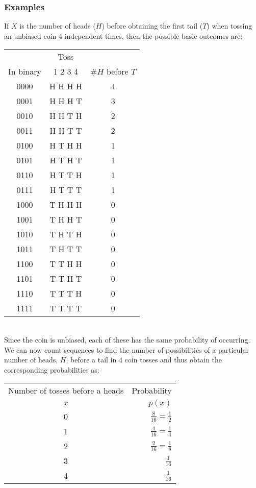 \documentclass[12pt,a4paper]{article}
\theoremstyle{regla}
\theoremstyle{remark}
\theoremstyle{definition}
\theoremstyle{nonumberbreak}
\begin{document}
\subsubsection{Examples}
\begin{xmpl}
If $X$ is the number of heads ($H$) before obtaining the first tail ($T$) when tossing an unbiased coin 4 independent times, then the possible basic outcomes are:

\begin{tabular}{c c c}
\hline
         & Toss    &   \\
In binary& 1 2 3 4 & \#$H$ before $T$\\
\hline				
0000 & H H H H & 4\\
0001 & H H H T & 3\\
0010 & H H T H & 2\\
0011 & H H T T & 2\\
0100 & H T H H & 1\\
0101 & H T H T & 1\\
0110 & H T T H & 1\\
0111 & H T T T & 1\\
1000 & T H H H & 0\\
1001 & T H H T & 0\\
1010 & T H T H & 0\\
1011 & T H T T & 0\\
1100 & T T H H & 0\\
1101 & T T H T & 0\\
1110 & T T T H & 0\\
1111 & T T T T & 0\\
\hline
\end{tabular}\\

Since the coin is unbiased, each of these has the 
same probability of occurring.  We can now count sequences to find the number of possibilities of a particular number of heads, $H$, before a tail in 4 coin tosses and thus obtain the corresponding probabilities as:\\

\begin{tabular}{c r}
\hline
Number of tosses before a heads & Probability\\
$x$ & $p(x)$\\
\hline				
0 & $\frac{8}{16}=\frac{1}{2}$\\
1 & $\frac{4}{16}=\frac{1}{4}$\\
2 & $\frac{2}{16}=\frac{1}{8}$\\
3 & $\frac{1}{16}$\\
4 & $\frac{1}{16}$\\
\hline
\end{tabular}\\
\end{xmpl}
\end{document}
